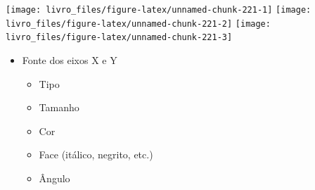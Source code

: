 \documentclass[
]{book}
\begin{document}
\begin{center}\texttt{[image: livro\_files/figure-latex/unnamed-chunk-221-1]} \texttt{[image: livro\_files/figure-latex/unnamed-chunk-221-2]} \texttt{[image: livro\_files/figure-latex/unnamed-chunk-221-3]} \end{center}

\begin{itemize}
\item
  Fonte dos eixos X e Y

  \begin{itemize}
  \item
    Tipo
  \item
    Tamanho
  \item
    Cor
  \item
    Face (itálico, negrito, etc.)
  \item
    Ângulo
  \end{itemize}
\end{itemize}
\end{document}
